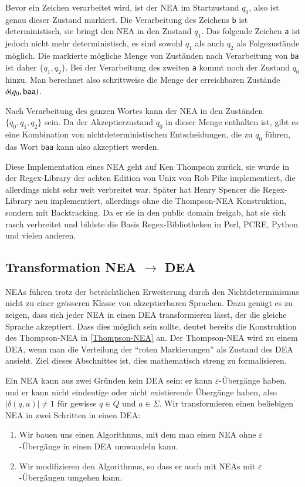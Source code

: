 Bevor ein Zeichen verarbeitet wird,
ist der NEA im Startzustand $q_0$, also ist genau dieser Zustand
markiert.
Die Verarbeitung des Zeichens {\tt b} ist deterministisch,
sie bringt den NEA in den Zustand $q_1$.
Das folgende Zeichen {\tt a}
ist jedoch nicht mehr deterministisch, es sind sowohl $q_1$ als auch
$q_2$ als Folgezustände möglich.
Die markierte mögliche Menge von Zuständen nach Verarbeitung von {\tt ba}
ist daher $\{q_1,q_2\}$.
Bei der Verarbeitung des zweiten {\tt a} kommt noch der Zustand $q_0$ hinzu.
Man berechnet also schrittweise die
Menge der erreichbaren Zustände $\delta(q_0,{\tt baa})$.

Nach Verarbeitung des ganzen Wortes kann der NEA in den Zuständen
$\{q_0,q_1,q_2\}$ sein.
Da der Akzeptierzustand $q_0$ in dieser Menge
enthalten ist, gibt es eine Kombination von nichtdeterministischen
Entscheidungen, die zu $q_0$ führen, das Wort {\tt baa} kann also
akzeptiert werden.

%
%
Diese Implementation eines NEA geht auf Ken Thompson zurück, sie wurde in
der Regex-Library der achten Edition von Unix von Rob Pike
%
implementiert, die allerdings nicht sehr weit verbreitet war.
Später hat Henry Spencer die Regex-Library neu
implementiert, allerdings ohne die Thompson-NEA Konstruktion, sondern
mit Backtracking.
Da er sie in den public domain freigab, hat sie sich
rasch verbreitet und bildete die Basis Regex-Bibliotheken in Perl, PCRE,
Python und vielen anderen.

\subsection{Transformation NEA \texorpdfstring{$\rightarrow$}{->} DEA\label{regulaer:nea-dea}}
NEAs führen trotz der beträchtlichen Erweiterung durch den
Nichtdeterminismus nicht zu einer grösseren Klasse von akzeptierbaren
Sprachen.
Dazu genügt es zu zeigen, dass sich jeder NEA in einen DEA
transformieren lässt, der die gleiche Sprache akzeptiert.
Dass dies möglich sein sollte, deutet bereits die Konstruktion
des Thompson-NEA in \ref{Thompson-NEA} an.
Der Thompson-NEA wird zu einem DEA, wenn man die Verteilung der
``roten Markierungen'' als Zustand des DEA ansieht.
Ziel dieses Abschnittes ist, dies
mathematisch streng zu formalisieren.

Ein NEA kann aus zwei Gründen kein DEA sein:
er kann $\varepsilon$-Übergänge haben, und er kann nicht eindeutige
oder nicht existierende Übergänge haben, also $|\delta(q,a)|\ne 1$
für gewisse $q\in Q$ und $a\in\Sigma$.
Wir transformieren einen 
beliebigen NEA in zwei Schritten in einen DEA:
\begin{enumerate}
\item Wir bauen uns einen Algorithmus, mit dem man einen NEA ohne
$\varepsilon$-Übergänge in einen DEA umwandeln kann.
\item Wir modifizieren den Algorithmus, so dass er auch mit NEAs mit
$\varepsilon$-Übergängen umgehen kann.
\end{enumerate}

